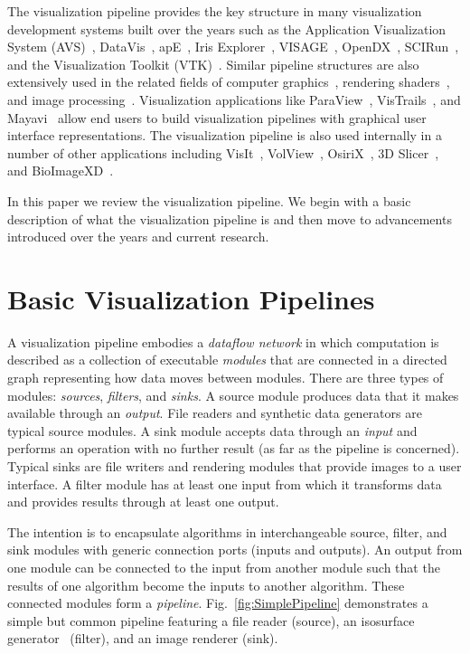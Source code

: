 \documentclass[journal,twocolumn,10pt,letterpaper,twoside]{IEEEtran}
\newcommand*{\lcite}[1]{~\cite{#1}}
\newcommand*{\figref}[1]{Fig.~\ref{#1}}
\newcommand*{\keyterm}[1]{\emph{#1}}
\begin{document}
The visualization pipeline provides the key structure in many visualization
development systems built over the years such as the Application
Visualization System (AVS)\lcite{AVS}, DataVis\lcite{DataVis},
apE\lcite{apE}, Iris Explorer\lcite{IRISExplorer}, VISAGE\lcite{VISAGE},
OpenDX\lcite{OpenDX}, SCIRun\lcite{SCIRun}, and the Visualization Toolkit
(VTK)\lcite{VTK}.  Similar pipeline structures are also extensively used in
the related fields of computer graphics\lcite{Haeberli1988,Kass1992},
rendering shaders\lcite{Abram1990,Cook1984,Perlin1985}, and image
processing\lcite{Koelma1994,Williams1990,Wilson1989,ITK}.  Visualization
applications like ParaView\lcite{ParaView}, VisTrails\lcite{VisTrails}, and
Mayavi\lcite{Mayavi} allow end users to build visualization pipelines with
graphical user interface representations.  The visualization pipeline is
also used internally in a number of other applications including
VisIt\lcite{VisIt}, VolView\lcite{VolView}, OsiriX\lcite{OsiriX}, 3D
Slicer\lcite{3DSlicer}, and BioImageXD\lcite{BioImageXD}.

In this paper we review the visualization pipeline.  We begin with a basic
description of what the visualization pipeline is and then move to
advancements introduced over the years and current research.


\section{Basic Visualization Pipelines}
\label{sec:BasicVisualizationPipelines}

A visualization pipeline embodies a \keyterm{dataflow network} in which
computation is described as a collection of executable \keyterm{modules}
that are connected in a directed graph representing how data moves between
modules.  There are three types of modules: \keyterm{sources},
\keyterm{filters}, and \keyterm{sinks}.  A source module produces data that
it makes available through an \keyterm{output}.  File readers and synthetic
data generators are typical source modules.  A sink module accepts data
through an \keyterm{input} and performs an operation with no further result
(as far as the pipeline is concerned).  Typical sinks are file writers and
rendering modules that provide images to a user interface.  A filter
module has at least one input from which it transforms data and provides
results through at least one output.

The intention is to encapsulate algorithms in interchangeable source,
filter, and sink modules with generic connection ports (inputs and
outputs).  An output from one module can be connected to the input from
another module such that the results of one algorithm become the inputs
to another algorithm.  These connected modules form a
\keyterm{pipeline}.  \figref{fig:SimplePipeline} demonstrates a simple
but common pipeline featuring a file reader (source), an isosurface
generator\lcite{Lorensen1987} (filter), and an image renderer (sink).
\end{document}
